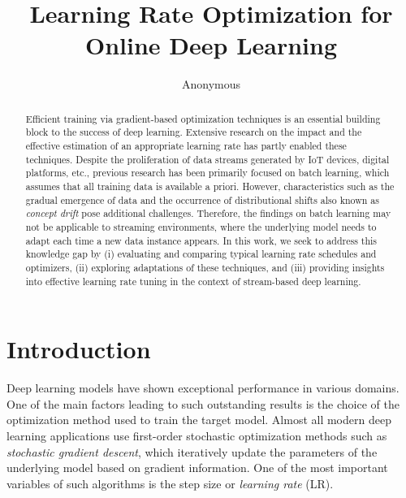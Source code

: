 \documentclass[runningheads]{llncs}
\begin{document}
%
\title{Learning Rate Optimization for Online Deep Learning}
%
%
\author{Anonymous}
%
%
%

\maketitle
%
\begin{abstract}
	Efficient training via gradient-based optimization techniques is an essential building block to the success of deep learning. Extensive research on the impact and the effective estimation of an appropriate learning rate has partly enabled these techniques. Despite the proliferation of data streams generated by IoT devices, digital platforms, etc., previous research has been primarily focused on batch learning, which assumes that all training data is available a priori. However, characteristics such as the gradual emergence of data and the occurrence of distributional shifts also known as \textit{concept drift} pose additional challenges. Therefore, the findings on batch learning may not be applicable to streaming environments, where the underlying model needs to adapt each time a new data instance appears. In this work, we seek to address this knowledge gap by (i) evaluating and comparing typical learning rate schedules and optimizers, (ii) exploring adaptations of these techniques, and (iii) providing insights into effective learning rate tuning in the context of stream-based deep learning.

\end{abstract}
%
%
%
\section{Introduction}
Deep learning models have shown exceptional performance in various domains.
One of the main factors leading to such outstanding results is the choice of the optimization method used to train the target model.
Almost all modern deep learning applications use first-order stochastic optimization methods such as \textit{stochastic gradient descent}, which iteratively update the parameters of the underlying model based on gradient information.
One of the most important variables of such algorithms is the step size or \textit{learning rate} (LR).
\end{document}
